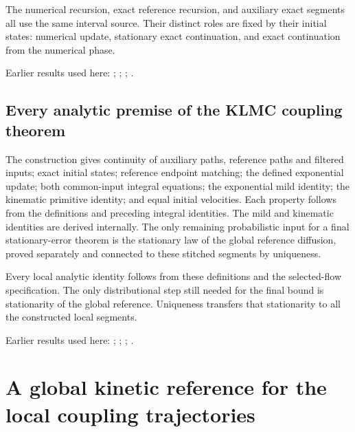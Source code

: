 \documentclass[11pt,a4paper]{report}
\begin{document}
The numerical recursion, exact reference recursion, and auxiliary exact segments all use the same interval source. Their distinct roles are fixed by their initial states: numerical update, stationary exact continuation, and exact continuation from the numerical phase.



Earlier results used here: \cite[Section~3.13.2]{LangevinLean2026ULASC}; \cite[Section~3.13.5]{LangevinLean2026ULASC}; \cite[Section~3.17.1]{LangevinLean2026ULASC}; \cite[Section~3.17.2]{LangevinLean2026ULASC}.
\subsection{\texorpdfstring{Every analytic premise of the KLMC coupling theorem}{Every analytic premise of the KLMC coupling theorem}}
\label{report-step-KineticLangevin-CanonicalCoupledSegments-lean-7}


The construction gives continuity of auxiliary paths, reference paths and filtered inputs; exact initial states; reference endpoint matching; the defined exponential update; both common-input integral equations; the exponential mild identity; the kinematic primitive identity; and equal initial velocities. Each property follows from the definitions and preceding integral identities. The mild and kinematic identities are derived internally. The only remaining probabilistic input for a final stationary-error theorem is the stationary law of the global reference diffusion, proved separately and connected to these stitched segments by uniqueness.



Every local analytic identity follows from these definitions and the selected-flow specification. The only distributional step still needed for the final bound is stationarity of the global reference. Uniqueness transfers that stationarity to all the constructed local segments.



Earlier results used here: \cite[Section~3.13.2]{LangevinLean2026ULASC}; \cite[Section~3.13.5]{LangevinLean2026ULASC}; \cite[Section~3.17.1]{LangevinLean2026ULASC}; \cite[Section~3.17.2]{LangevinLean2026ULASC}.
\section{\texorpdfstring{A global kinetic reference for the local coupling trajectories}{A global kinetic reference for the local coupling trajectories}}
\label{proof-module-KineticLangevin-CanonicalGlobalSegments-lean}
\end{document}
